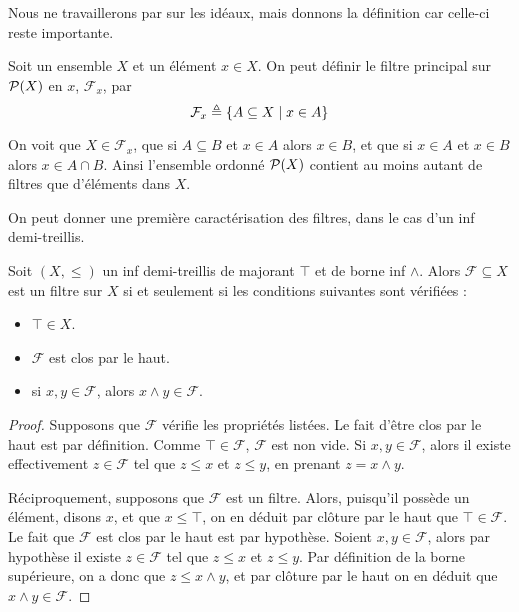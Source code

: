 Nous ne travaillerons par sur les idéaux, mais donnons la définition car
celle-ci reste importante.

\begin{example}
  Soit un ensemble $X$ et un élément $x\in X$. On peut définir le filtre
  principal sur $\mathcal{P}(X)$ en $x$, $\mathcal F_x$, par
  \[\mathcal F_x \triangleq \{A\subseteq X\mid x \in A\}\]

  On voit que $X\in \mathcal F_x$, que si $A\subseteq B$ et $x\in A$ alors
  $x\in B$, et que si $x\in A$ et $x\in B$ alors $x\in A\cap B$. Ainsi
  l'ensemble ordonné $\mathcal{P}(X)$ contient au moins autant de filtres que
  d'éléments dans $X$.
\end{example}

On peut donner une première caractérisation des filtres, dans le cas d'un
inf demi-treillis.

\begin{property}
  Soit $(X,\leq)$ un inf demi-treillis de majorant $\top$ et de borne inf
  $\land$. Alors $\mathcal F\subseteq X$ est un filtre sur $X$ si et seulement
  si les conditions suivantes sont vérifiées :
  \begin{itemize}
  \item $\top \in X$.
  \item $\mathcal F$ est clos par le haut.
  \item si $x,y\in \mathcal F$, alors $x\land y\in \mathcal F$.
  \end{itemize}
\end{property}

\begin{proof}
  Supposons que $\mathcal F$ vérifie les propriétés listées. Le fait d'être
  clos par le haut est par définition. Comme $\top\in\mathcal F$,
  $\mathcal F$ est non vide. Si $x,y\in\mathcal F$, alors il existe
  effectivement $z\in \mathcal F$ tel que $z\leq x$ et $z\leq y$, en prenant
  $z = x\land y$.

  Réciproquement, supposons que $\mathcal F$ est un filtre. Alors, puisqu'il
  possède un élément, disons $x$, et que $x\leq \top$, on en déduit par clôture
  par le haut que $\top\in\mathcal F$. Le fait que $\mathcal F$ est clos par le
  haut est par hypothèse. Soient $x,y\in \mathcal F$, alors par hypothèse il
  existe $z\in \mathcal F$ tel que $z\leq x$ et $z\leq y$. Par définition de la
  borne supérieure, on a donc que $z\leq x\land y$, et par clôture par le haut
  on en déduit que $x\land y \in \mathcal F$.
\end{proof}

